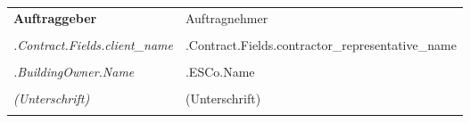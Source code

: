 
\mbox{}\vfill %
\begin{tabu}{X X} \tabucline{}
	\rowfont[c]\bfseries Auftraggeber & Auftragnehmer \\
	[10pt]\makebox[8cm]{\hrulefill} & \makebox[8cm]{\hrulefill} \\
	\rowfont[c]\itshape {{.Contract.Fields.client_name}} & {{.Contract.Fields.contractor_representative_name}} \\
	[10pt]\makebox[8cm]{\hrulefill} & \makebox[8cm]{\hrulefill} \\
	\rowfont[c]\itshape {{.BuildingOwner.Name}} & {{.ESCo.Name}} \\
	[10pt]\makebox[8cm]{\hrulefill} & \makebox[8cm]{\hrulefill} \\
	\rowfont[c]\itshape (Unterschrift) & (Unterschrift) \\[4cm] \\
\end{tabu}
\pagebreak
